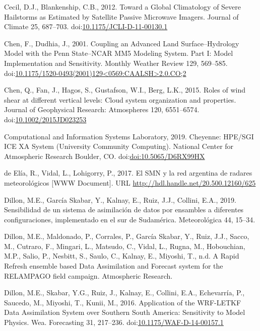 \documentclass[final,5p,times,twocolumn,authoryear]{elsarticle} %
\begin{document}
\leavevmode\hypertarget{ref-cecil2012}{}%
Cecil, D.J., Blankenship, C.B., 2012. Toward a Global Climatology of Severe Hailstorms as Estimated by Satellite Passive Microwave Imagers. Journal of Climate 25, 687--703. doi:\href{https://doi.org/10.1175/JCLI-D-11-00130.1}{10.1175/JCLI-D-11-00130.1}

\leavevmode\hypertarget{ref-chen2001}{}%
Chen, F., Dudhia, J., 2001. Coupling an Advanced Land Surface--Hydrology Model with the Penn State--NCAR MM5 Modeling System. Part I: Model Implementation and Sensitivity. Monthly Weather Review 129, 569--585. doi:\href{https://doi.org/10.1175/1520-0493(2001)129\%3C0569:CAALSH\%3E2.0.CO;2}{10.1175/1520-0493(2001)129\textless0569:CAALSH\textgreater2.0.CO;2}

\leavevmode\hypertarget{ref-chen2015}{}%
Chen, Q., Fan, J., Hagos, S., Gustafson, W.I., Berg, L.K., 2015. Roles of wind shear at different vertical levels: Cloud system organization and properties. Journal of Geophysical Research: Atmospheres 120, 6551--6574. doi:\href{https://doi.org/10.1002/2015JD023253}{10.1002/2015JD023253}

\leavevmode\hypertarget{ref-Cheyenne2019}{}%
Computational and Information Systems Laboratory, 2019. Cheyenne: HPE/SGI ICE XA System (University Community Computing). National Center for Atmospheric Research Boulder, CO. doi:\href{https://doi.org/doi:10.5065/D6RX99HX}{doi:10.5065/D6RX99HX}

\leavevmode\hypertarget{ref-deelia2017}{}%
de Elía, R., Vidal, L., Lohigorry, P., 2017. El SMN y la red argentina de radares meteorológicos {[}WWW Document{]}. URL \url{http://hdl.handle.net/20.500.12160/625}

\leavevmode\hypertarget{ref-dillon2019}{}%
Dillon, M.E., García Skabar, Y., Kalnay, E., Ruiz, J.J., Collini, E.A., 2019. Sensibilidad de un sistema de asimilación de datos por ensambles a diferentes configuraciones, implementado en el sur de Sudamérica. Meteorológica 44, 15--34.

\leavevmode\hypertarget{ref-dillonInreview}{}%
Dillon, M.E., Maldonado, P., Corrales, P., García Skabar, Y., Ruiz, J.J., Sacco, M., Cutraro, F., Mingari, L., Matsudo, C., Vidal, L., Rugna, M., Hobouchian, M.P., Salio, P., Nesbitt, S., Saulo, C., Kalnay, E., Miyoshi, T., n.d. A Rapid Refresh ensemble based Data Assimilation and Forecast system for the RELAMPAGO field campaign. Atmospheric Research.

\leavevmode\hypertarget{ref-dillon2016}{}%
Dillon, M.E., Skabar, Y.G., Ruiz, J., Kalnay, E., Collini, E.A., Echevarría, P., Saucedo, M., Miyoshi, T., Kunii, M., 2016. Application of the WRF-LETKF Data Assimilation System over Southern South America: Sensitivity to Model Physics. Wea. Forecasting 31, 217--236. doi:\href{https://doi.org/10.1175/WAF-D-14-00157.1}{10.1175/WAF-D-14-00157.1}
\end{document}
